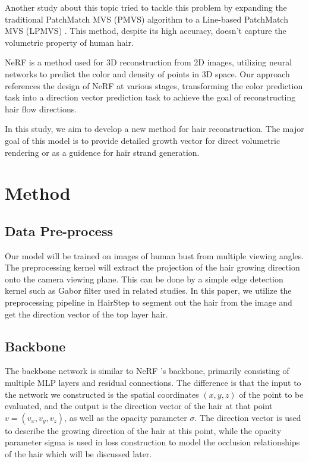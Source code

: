 \documentclass[12pt]{article}
\begin{document}
  Another study about this topic tried to tackle this problem by expanding the traditional PatchMatch MVS (PMVS) algorithm to a Line-based PatchMatch MVS (LPMVS) \cite{nam_strand-accurate_nodate}. This method, despite its high accuracy, doesn't capture the volumetric property of human hair.

  NeRF \cite{mildenhall_nerf_2020} is a method used for 3D reconstruction from 2D images, utilizing neural networks to predict the color and density of points in 3D space. Our approach references the design of NeRF at various stages, transforming the color prediction task into a direction vector prediction task to achieve the goal of reconstructing hair flow directions.

  In this study, we aim to develop a new method for hair reconstruction. The major goal of this model is to provide detailed growth vector for direct volumetric rendering or as a guidence for hair strand generation.

  \section{Method}
    \subsection{Data Pre-process}

    Our model will be trained on images of human bust from multiple viewing angles. The preprocessing kernel will extract the projection of the hair growing direction onto the camera viewing plane. This can be done by a simple edge detection kernel such as Gabor filter used in related studies. In this paper, we utilize the preprocessing pipeline in HairStep \cite{zheng_hairstep_2023} to segment out the hair from the image and get the direction vector of the top layer hair.
    
    \subsection{Backbone}
    
    The backbone network is similar to NeRF \cite{mildenhall_nerf_2020}'s backbone, primarily consisting of multiple MLP layers and residual connections. The difference is that the input to the network we constructed is the spatial coordinates $(x, y, z)$ of the point to be evaluated, and the output is the direction vector of the hair at that point $v = (v_x, v_y, v_z)$, as well as the opacity parameter $\sigma$. The direction vector is used to describe the growing direction of the hair at this point, while the opacity parameter sigma is used in loss construction to model the occlusion relationships of the hair which will be discussed later.
    
\end{document}
